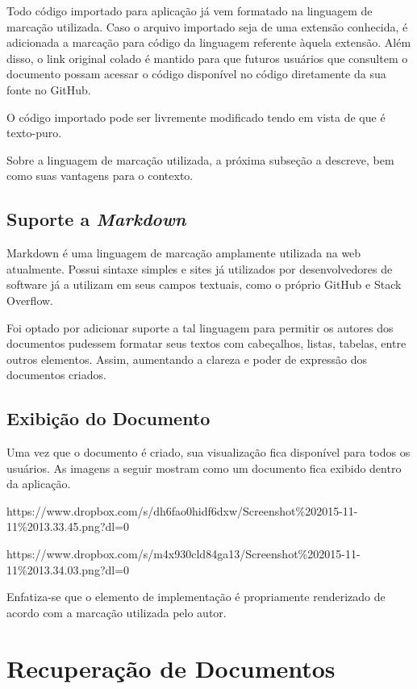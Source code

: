 
Todo código importado para aplicação já vem formatado na linguagem de marcação utilizada. Caso o arquivo importado seja de uma extensão conhecida, é adicionada a marcação para código da linguagem referente àquela extensão. Além disso, o link original colado é mantido para que futuros usuários que consultem o documento possam acessar o código disponível no código diretamente da sua fonte no GitHub.

O código importado pode ser livremente modificado tendo em vista de que é texto-puro.


Sobre a linguagem de marcação utilizada, a próxima subseção a descreve, bem como suas vantagens para o contexto.

\subsection{Suporte a \textit{Markdown}}

Markdown é uma linguagem de marcação amplamente utilizada na web atualmente. Possui sintaxe simples e sites já utilizados por desenvolvedores de software já a utilizam em seus campos textuais, como o próprio GitHub e Stack Overflow.

Foi optado por adicionar suporte a tal linguagem para permitir os autores dos documentos pudessem formatar seus textos com cabeçalhos, listas, tabelas, entre outros elementos. Assim, aumentando a clareza e poder de expressão dos documentos criados.

\subsection{Exibição do Documento}

Uma vez que o documento é criado, sua visualização fica disponível para todos os usuários. As imagens a seguir mostram como um documento fica exibido dentro da aplicação.

https://www.dropbox.com/s/dh6fao0hidf6dxw/Screenshot\%202015-11-11\%2013.33.45.png?dl=0

https://www.dropbox.com/s/m4x930cld84ga13/Screenshot\%202015-11-11\%2013.34.03.png?dl=0

Enfatiza-se que o elemento de implementação é propriamente renderizado de acordo com a marcação utilizada pelo autor.

\section{Recuperação de Documentos}


